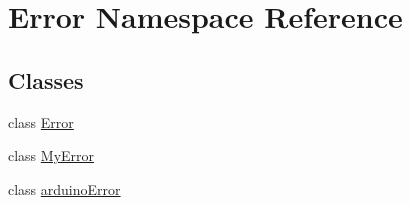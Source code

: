 \hypertarget{namespace_error}{\section{Error Namespace Reference}
\label{namespace_error}
}
\subsection*{Classes}
\begin{DoxyCompactItemize}
\item 
class \hyperlink{class_error_1_1_error}{Error}
\item 
class \hyperlink{class_error_1_1_my_error}{My\-Error}
\item 
class \hyperlink{class_error_1_1arduino_error}{arduino\-Error}
\end{DoxyCompactItemize}
